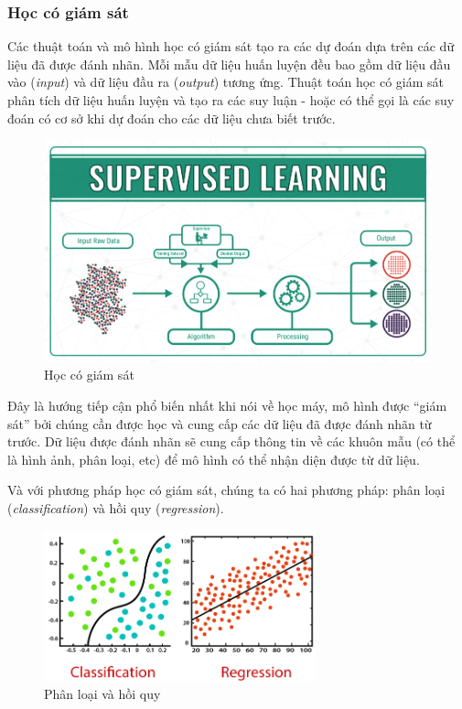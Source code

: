 \subsubsection{Học có giám sát}
Các thuật toán và mô hình học có giám sát tạo ra các dự đoán dựa trên các dữ liệu đã được đánh nhãn. Mỗi mẫu dữ liệu huấn luyện đều bao gồm dữ liệu đầu vào (\textit{input}) và dữ liệu đầu ra (\textit{output}) tương ứng. Thuật toán học có giám sát phân tích dữ liệu huấn luyện và tạo ra các suy luận - hoặc có thể gọi là các suy đoán có cơ sở khi dự đoán cho các dữ liệu chưa biết trước.\cite{webpage}
\begin{figure}[htb]
    \centering
    \includegraphics[width=\textwidth]{image/supervised-learning.png}
    \caption{Học có giám sát}
    \label{figure:supervised-learning}
\end{figure}

Đây là hướng tiếp cận phổ biến nhất khi nói về học máy, mô hình được “giám sát” bởi chúng cần được học và cung cấp các dữ liệu đã được đánh nhãn từ trước. Dữ liệu được đánh nhãn sẽ cung cấp thông tin về các khuôn mẫu (có thể là hình ảnh, phân loại, etc) để mô hình có thể nhận diện được từ dữ liệu.\cite{webpage}

Và với phương pháp học có giám sát, chúng ta có hai phương pháp: phân loại (\textit{classification}) và hồi quy (\textit{regression}).
\begin{figure}[htb]
    \centering
    \includegraphics[width=0.7\textwidth]{image/regression-vs-classification-in-machine-learning.png}
    \caption{Phân loại và hồi quy}
    \label{figure:regression-vs-classification-in-machine-learning}
\end{figure}

